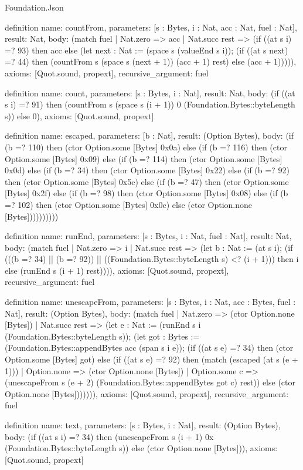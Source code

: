 \begin{lexlean}{Foundation.Json}
\begin{semanticmodule}
definition{
  name: countFrom,
  parameters: [s : Bytes, i : Nat, acc : Nat, fuel : Nat],
  result: Nat,
  body: (match fuel
    | Nat.zero => acc
    | Nat.succ rest => (if ((at s i) =? 93) then acc else (let next : Nat := (space s (valueEnd s i)); (if ((at s next) =? 44) then (countFrom s (space s (next + 1)) (acc + 1) rest) else (acc + 1))))),
  axioms: [Quot.sound, propext],
  recursive_argument: fuel
}

definition{
  name: count,
  parameters: [s : Bytes, i : Nat],
  result: Nat,
  body: (if ((at s i) =? 91) then (countFrom s (space s (i + 1)) 0 (Foundation.Bytes::byteLength s)) else 0),
  axioms: [Quot.sound, propext]
}

definition{
  name: escaped,
  parameters: [b : Nat],
  result: (Option Bytes),
  body: (if (b =? 110) then (ctor Option.some [Bytes] 0x0a) else (if (b =? 116) then (ctor Option.some [Bytes] 0x09) else (if (b =? 114) then (ctor Option.some [Bytes] 0x0d) else (if (b =? 34) then (ctor Option.some [Bytes] 0x22) else (if (b =? 92) then (ctor Option.some [Bytes] 0x5c) else (if (b =? 47) then (ctor Option.some [Bytes] 0x2f) else (if (b =? 98) then (ctor Option.some [Bytes] 0x08) else (if (b =? 102) then (ctor Option.some [Bytes] 0x0c) else (ctor Option.none [Bytes])))))))))
}

definition{
  name: runEnd,
  parameters: [s : Bytes, i : Nat, fuel : Nat],
  result: Nat,
  body: (match fuel
    | Nat.zero => i
    | Nat.succ rest => (let b : Nat := (at s i); (if (((b =? 34) || (b =? 92)) || ((Foundation.Bytes::byteLength s) <? (i + 1))) then i else (runEnd s (i + 1) rest)))),
  axioms: [Quot.sound, propext],
  recursive_argument: fuel
}

definition{
  name: unescapeFrom,
  parameters: [s : Bytes, i : Nat, acc : Bytes, fuel : Nat],
  result: (Option Bytes),
  body: (match fuel
    | Nat.zero => (ctor Option.none [Bytes])
    | Nat.succ rest => (let e : Nat := (runEnd s i (Foundation.Bytes::byteLength s)); (let got : Bytes := (Foundation.Bytes::appendBytes acc (span s i e)); (if ((at s e) =? 34) then (ctor Option.some [Bytes] got) else (if ((at s e) =? 92) then (match (escaped (at s (e + 1)))
      | Option.none => (ctor Option.none [Bytes])
      | Option.some c => (unescapeFrom s (e + 2) (Foundation.Bytes::appendBytes got c) rest)) else (ctor Option.none [Bytes])))))),
  axioms: [Quot.sound, propext],
  recursive_argument: fuel
}

definition{
  name: text,
  parameters: [s : Bytes, i : Nat],
  result: (Option Bytes),
  body: (if ((at s i) =? 34) then (unescapeFrom s (i + 1) 0x (Foundation.Bytes::byteLength s)) else (ctor Option.none [Bytes])),
  axioms: [Quot.sound, propext]
}


\end{semanticmodule}
\end{lexlean}

